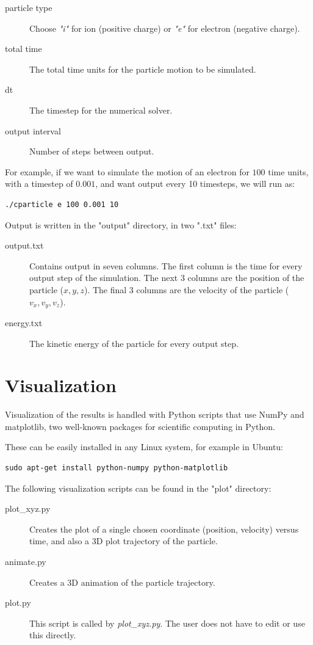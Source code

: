 \documentclass[11pt]{report}
\begin{document}
\begin{description}
\item[particle type] Choose \emph{"i"} for ion (positive charge) or \emph{"e"} for electron (negative charge).
\item[total time] The total time units for the particle motion to be simulated. 
\item[dt] The timestep for the numerical solver.
\item[output interval] Number of steps between output.
\end{description}

For example, if we want to simulate the motion of an electron for $100$ time units, with a timestep of $0.001$, and want output every 10 timesteps, we will run as:

\begin{lstlisting}
./cparticle e 100 0.001 10
\end{lstlisting}

Output is written in the "output" directory, in two ".txt" files:

\begin{description}
\item[output.txt] Contains output in seven columns. The first column is the time for every output step of the simulation. The next 3 columns are the position of the particle ($x, y, z$). The final 3 columns are the velocity of the particle ($v_x, v_y, v_z$).
\item[energy.txt] The kinetic energy of the particle for every output step.
\end{description}

\section{Visualization}
Visualization of the results is handled with Python scripts that use NumPy and matplotlib, two well-known packages for scientific computing in Python.

These can be easily installed in any Linux system, for example in Ubuntu:

\begin{lstlisting}
sudo apt-get install python-numpy python-matplotlib
\end{lstlisting}

The following visualization scripts can be found in the "plot" directory:

\begin{description}
\item[plot\_xyz.py] Creates the plot of a single chosen coordinate (position, velocity) versus time, and also a 3D plot trajectory of the particle. 
\item[animate.py] Creates a 3D animation of the particle trajectory.
\item[plot.py] This script is called by \emph{plot\_xyz.py}. The user does not have to edit or use this directly.
\end{description}
\end{document}
